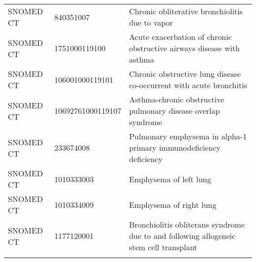 \begin{longtable}{p{}p{}p{}}
  SNOMED CT & 840351007 & Chronic obliterative bronchiolitis due to vapor \\ 
  SNOMED CT & 1751000119100 & Acute exacerbation of chronic obstructive airways disease with asthma \\ 
  SNOMED CT & 106001000119101 & Chronic obstructive lung disease co-occurrent with acute bronchitis \\ 
  SNOMED CT & 10692761000119107 & Asthma-chronic obstructive pulmonary disease overlap syndrome \\ 
  SNOMED CT & 233674008 & Pulmonary emphysema in alpha-1 primary immunodeficiency deficiency \\ 
  SNOMED CT & 1010333003 & Emphysema of left lung \\ 
  SNOMED CT & 1010334009 & Emphysema of right lung \\ 
  SNOMED CT & 1177120001 & Bronchiolitis obliterans syndrome due to and following allogeneic stem cell transplant \\ 
  \hline
\label{tab:codes_copd}
\end{longtable}
